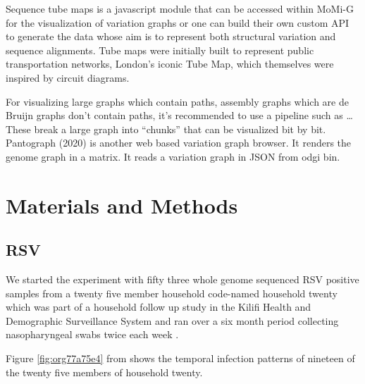 \documentclass[10pt, a4paper]{article}
\begin{document}
Sequence tube maps \cite{beyerSequenceTubeMaps2019} is a javascript module that
can be accessed within MoMi-G for the visualization of variation graphs or one
can  build their own custom API to generate the data whose aim is to represent
both structural variation and sequence alignments.
Tube maps were initially built to represent public transportation networks,
London’s iconic Tube Map, \cite{cartwrightamBeckRepresentationLondon2012} which
themselves were inspired by circuit diagrams.

For visualizing large graphs which contain paths, assembly graphs which are de
Bruijn graphs don’t contain paths, it’s recommended to use a pipeline such as …
These break a large graph into “chunks” that can be visualized bit by bit.
Pantograph (2020) is another web based variation graph browser.
It renders the genome graph in a matrix. It reads a variation graph in JSON from
odgi bin.


\newpage
\section{Materials and Methods}
\label{sec:org54694c9}
\subsection{RSV}
\label{sec:org39bf736}
We started the experiment with fifty three whole genome sequenced RSV 
positive samples from a twenty five member household code-named household twenty
which was part of a household follow up study in the Kilifi Health and 
Demographic Surveillance System and ran over a six month
period collecting nasopharyngeal swabs twice each week
\cite{munywokiInfluenceAgeSeverity2015,agotiTransmissionPatternsEvolution2017,githinjiAssessingUtilityMinority2018}.

Figure \ref{fig:org77a75e4} from
\cite{githinjiAssessingUtilityMinority2018} shows the temporal infection patterns
of nineteen of the twenty five members of household twenty.
\end{document}
